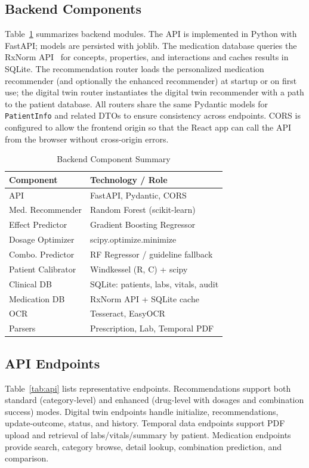 \documentclass[conference]{IEEEtran}
\begin{document}
\subsection{Backend Components}
Table~\ref{tab:backend} summarizes backend modules. The API is implemented in Python with FastAPI; models are persisted with joblib. The medication database queries the RxNorm API~\cite{rxnormapi} for concepts, properties, and interactions and caches results in SQLite. The recommendation router loads the personalized medication recommender (and optionally the enhanced recommender) at startup or on first use; the digital twin router instantiates the digital twin recommender with a path to the patient database. All routers share the same Pydantic models for \texttt{PatientInfo} and related DTOs to ensure consistency across endpoints. CORS is configured to allow the frontend origin so that the React app can call the API from the browser without cross-origin errors.

\begin{table}[t]
\caption{Backend Component Summary}
\label{tab:backend}
\centering
\footnotesize
\begin{tabular}{@{}p{}p{}@{}}
\toprule
\textbf{Component} & \textbf{Technology / Role} \\
\midrule
API & FastAPI, Pydantic, CORS \\
Med. Recommender & Random Forest (scikit-learn) \\
Effect Predictor & Gradient Boosting Regressor \\
Dosage Optimizer & scipy.optimize.minimize \\
Combo. Predictor & RF Regressor / guideline fallback \\
Patient Calibrator & Windkessel (R, C) + scipy \\
Clinical DB & SQLite: patients, labs, vitals, audit \\
Medication DB & RxNorm API + SQLite cache \\
OCR & Tesseract, EasyOCR \\
Parsers & Prescription, Lab, Temporal PDF \\
\bottomrule
\end{tabular}
\end{table}

\subsection{API Endpoints}
Table~\ref{tab:api} lists representative endpoints. Recommendations support both standard (category-level) and enhanced (drug-level with dosages and combination success) modes. Digital twin endpoints handle initialize, recommendations, update-outcome, status, and history. Temporal data endpoints support PDF upload and retrieval of labs/vitals/summary by patient. Medication endpoints provide search, category browse, detail lookup, combination prediction, and comparison.
\end{document}
